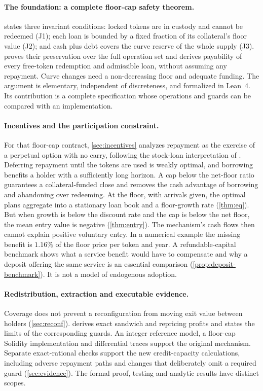 \paragraph{The foundation: a complete floor-cap safety theorem.}
 states three invariant conditions: locked tokens are in custody and cannot be redeemed (J1); each loan is bounded by a fixed fraction of its collateral's floor value (J2); and cash plus debt covers the curve reserve of the whole supply (J3).  proves their preservation over the full operation set and derives payability of every free-token redemption and admissible loan, without assuming any repayment. Curve changes need a non-decreasing floor and adequate funding. The argument is elementary, independent of discreteness, and formalized in Lean~4. Its contribution is a complete specification whose operations and guards can be compared with an implementation.

\paragraph{Incentives and the participation constraint.}
For that floor-cap contract, \cref{sec:incentives} analyzes repayment as the exercise of a perpetual option with no carry, following the stock-loan interpretation of \citet{xiazhou2007}. Deferring repayment until the tokens are used is weakly optimal, and borrowing benefits a holder with a sufficiently long horizon. A cap below the net-floor ratio guarantees a collateral-funded close and removes the cash advantage of borrowing and abandoning over redeeming. At the floor, with arrivals given, the optimal plans aggregate into a stationary loan book and a floor-growth rate (\cref{thm:eq}). But when growth is below the discount rate and the cap is below the net floor, the mean entry value is negative (\cref{thm:entry}). The mechanism's cash flows then cannot explain positive voluntary entry. In a numerical example the missing benefit is $1.16\%$ of the floor price per token and year. A refundable-capital benchmark shows what a service benefit would have to compensate and why a deposit offering the same service is an essential comparison (\cref{prop:deposit-benchmark}). It is not a model of endogenous adoption.

\paragraph{Redistribution, extraction and executable evidence.}
Coverage does not prevent a reconfiguration from moving exit value between holders (\cref{sec:reconf}).  derives exact sandwich and repricing profits and states the limits of the corresponding guards. An integer reference model, a floor-cap Solidity implementation and differential traces support the original mechanism. Separate exact-rational checks support the new credit-capacity calculations, including adverse repayment paths and changes that deliberately omit a required guard (\cref{sec:evidence}). The formal proof, testing and analytic results have distinct scopes.


